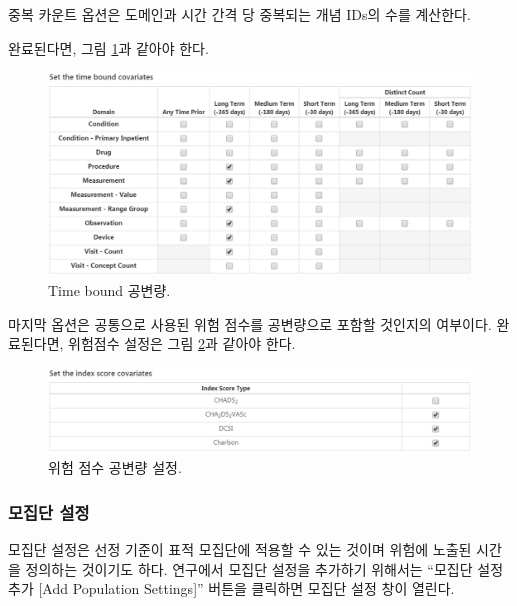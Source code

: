 \documentclass[11pt]{book}
\theoremstyle{definition}
\theoremstyle{definition}
\theoremstyle{definition}
\theoremstyle{remark}
\begin{document}
중복 카운트 옵션은 도메인과 시간 간격 당 중복되는 개념 IDs의 수를
계산한다.

완료된다면, 그림 \ref{fig:covariateSettings5}과 같아야 한다.

\begin{figure}

{\centering \includegraphics[width=1\linewidth]{images/PatientLevelPrediction/covariateSettings5} 

}

\caption{Time bound 공변량.}\label{fig:covariateSettings5}
\end{figure}

마지막 옵션은 공통으로 사용된 위험 점수를 공변량으로 포함할 것인지의
여부이다. 완료된다면, 위험점수 설정은 그림
\ref{fig:covariateSettings6}과 같아야 한다.

\begin{figure}

{\centering \includegraphics[width=1\linewidth]{images/PatientLevelPrediction/covariateSettings6} 

}

\caption{위험 점수 공변량 설정.}\label{fig:covariateSettings6}
\end{figure}

\subsubsection*{모집단 설정}\label{-}

모집단 설정은 선정 기준이 표적 모집단에 적용할 수 있는 것이며 위험에
노출된 시간을 정의하는 것이기도 하다. 연구에서 모집단 설정을 추가하기
위해서는 ``모집단 설정 추가 {[}Add Population Settings{]}'' 버튼을
클릭하면 모집단 설정 창이 열린다.
\end{document}
